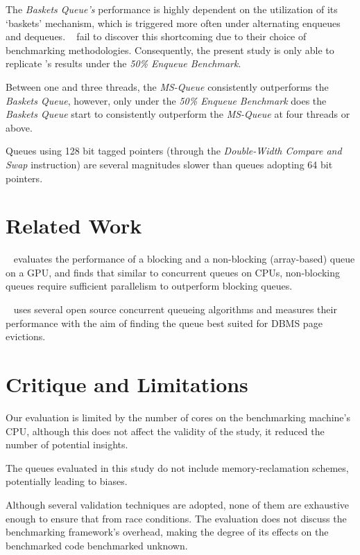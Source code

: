 The \emph{Baskets Queue's} performance is highly dependent on the
utilization of its `baskets' mechanism, which is triggered more often under
alternating enqueues and dequeues. \citeauthor{hoffman2007baskets}~\citep{hoffman2007baskets} fail to
discover this shortcoming due to their choice of benchmarking methodologies.
Consequently, the present study is only able to replicate
\citeauthor{hoffman2007baskets}'s results under the \emph{50\% Enqueue
Benchmark}.

Between one and three threads, the \emph{MS-Queue} consistently outperforms the
\emph{Baskets Queue}, however, only under the \emph{50\% Enqueue Benchmark} does the
\emph{Baskets Queue} start to consistently outperform the \emph{MS-Queue}
at four threads or above.

Queues using 128 bit tagged pointers (through the \emph{Double-Width Compare and
Swap} instruction) are several magnitudes slower than queues adopting 64 bit
pointers.

\section{Related Work}
\citeauthor{pourmeidani2019performance}~\citep{pourmeidani2019performance} evaluates the performance of a blocking
and a non-blocking (array-based) queue on a GPU, and finds that similar to
concurrent queues on CPUs, non-blocking queues require sufficient parallelism
to outperform blocking queues.

\citeauthor{gilbert2020performance}~\citep{gilbert2020performance}
uses several open source concurrent queueing algorithms and measures
their performance with the aim of finding the queue best suited for DBMS page
evictions.

\section{Critique and Limitations}
Our evaluation is limited by the number of cores on the benchmarking
machine's CPU, although this does not affect the validity of the study, it
reduced the number of potential insights.

The queues evaluated in this study do not include memory-reclamation schemes,
potentially leading to biases.

Although several validation techniques are adopted, none of them are exhaustive
enough to ensure that from race conditions. The evaluation does not
discuss the benchmarking framework's overhead, making the degree of its effects
on the benchmarked code benchmarked unknown.

